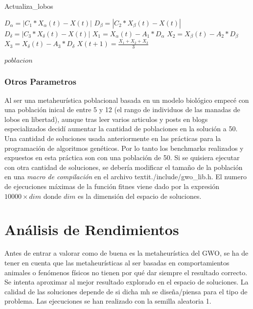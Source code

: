\documentclass[a4paper, 12.5pt]{report}
\begin{document}
\begin{algorithm}[H]
    \caption{Actualiza\_lobos}\label{alg:AW}
    \begin{algorithmic}[1]

        \State $D_\alpha=|C_1*X_\alpha(t)-X(t)| $
        \State $D_\beta=|C_2*X_\beta(t)-X(t)| $
        \State $D_\delta=|C_3*X_\delta(t)-X(t)| $
        \State $X_1=X_\alpha(t)-A_1*D_\alpha$
        \State $X_2=X_\beta(t)-A_2*D_\beta$
        \State $X_3=X_\delta(t)-A_3*D_\delta$
        \State $X(t+1)=\frac{X_1+X_2+X_3}{3}$ 

        \EndFor

        \Return $poblacion$
        \EndFunction


    \end{algorithmic}
\end{algorithm}


\subsubsection*{Otros Parametros}
Al ser una metaheurística poblacional basada en un modelo biológico empecé con una población inical de entre 5 y 12 (el rango de individuos de las manadas de lobos en libertad), aunque tras leer varios articulos y posts en blogs especializados decidí aumentar la cantidad de poblaciones en la solución a 50. Una cantidad de soluciones usada anteriormente en las prácticas para la programación de algoritmos genéticos. Por lo tanto los benchmarks realizados y expuestos en esta práctica son con una población de 50. Si se quisiera ejecutar con otra cantidad de soluciones, se debería modificar el tamaño de la población en una \textit{macro de compilación} en el archivo textit{./include/gwo\_lib.h}. El numero de ejecuciones máximas de la función fitnes viene dado por la expresión $10000 \times dim$ donde $dim$ es la dimensión del espacio de soluciones.






\section{Análisis de Rendimientos}

Antes de entrar a valorar como de buena es la metaheurística del GWO, se ha de tener en cuenta que las metaheurísticas al ser basadas en comportamientos animales o fenómenos físicos no tienen por qué dar siempre el resultado correcto.
Se intenta aproximar al mejor resultado explorado en el espacio de soluciones.     La calidad de las soluciones depende de si dicha mh se diseña/piensa para el tipo de problema. Las ejecuciones se han realizado con la semilla aleatoria 1.
\end{document}
